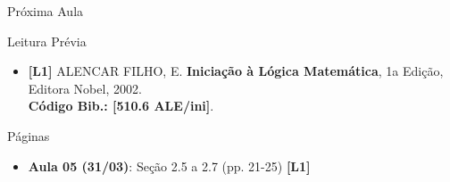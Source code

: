 \documentclass[xcolor=dvipsnames,table]{beamer}
\begin{document}
\begin{frame}{Próxima Aula}
    \begin{block}{Leitura Prévia}
        \begin{itemize}
            \item {\bf \color{blue} [L1]} ALENCAR FILHO, E. {\bf Iniciação à Lógica Matemática}, 1a Edição, Editora Nobel, 2002. \\{\color{blue} \bf Código Bib.: [510.6 ALE/ini]}.
        \end{itemize}
    \end{block}
    \begin{block}{Páginas}
        \begin{itemize}
        \item {\bf Aula 05 (31/03)}: Seção 2.5 a 2.7 (pp. 21-25) {\bf \color{blue} [L1]} 
        \end{itemize}
    \end{block}
\end{frame}
	
	\begin{frame}
		\titlepage
	\end{frame}
	
\end{document}
